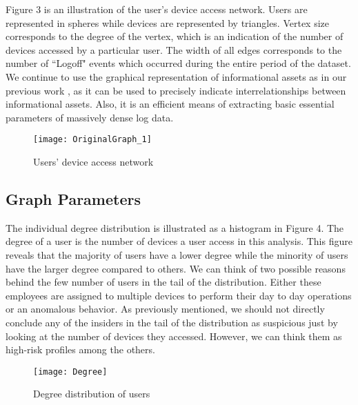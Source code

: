 \documentclass[conference,draftclsnofoot,onecolumn]{IEEEtran}%
\begin{document}
Figure 3 is an illustration of the user's device access network. Users are represented in spheres while devices are represented by triangles. Vertex size corresponds to the degree of the vertex, which is an indication of the number of devices accessed by a particular user. The width of all edges corresponds to the number of ``Logoff" events which occurred during the entire period of the dataset. We continue to use the graphical representation of informational assets as in our previous work \cite{Anagi}, as it can be used to precisely indicate interrelationships between informational assets. Also, it is an efficient means of extracting basic essential parameters of massively dense log data. 

\begin{figure}[h]
\centering
\texttt{[image: OriginalGraph\_1]}%
\caption{Users' device access network}
\label{figure 3}
\vspace{-5pt}
\end{figure} 

\subsection{Graph Parameters}
The individual degree distribution is illustrated as a histogram in Figure 4. The degree of a user is the number of devices a user access in this analysis. This figure reveals that the majority of users have a lower degree while the minority of users have the larger degree compared to others. We can think of two possible reasons behind the few number of users in the tail of the distribution. Either these employees are assigned to multiple devices to perform their day to day operations or an anomalous behavior. As previously mentioned, we should not directly conclude any of the insiders in the tail of the distribution as suspicious just by looking at the number of devices they accessed. However, we can think them as high-risk profiles among the others.    

\begin{figure}[!t]
\centering
\vspace{-10pt}
\texttt{[image: Degree]}
\caption{Degree distribution of users}
\label{figure 4}
\vspace{-5pt}
\end{figure}
\end{document}
